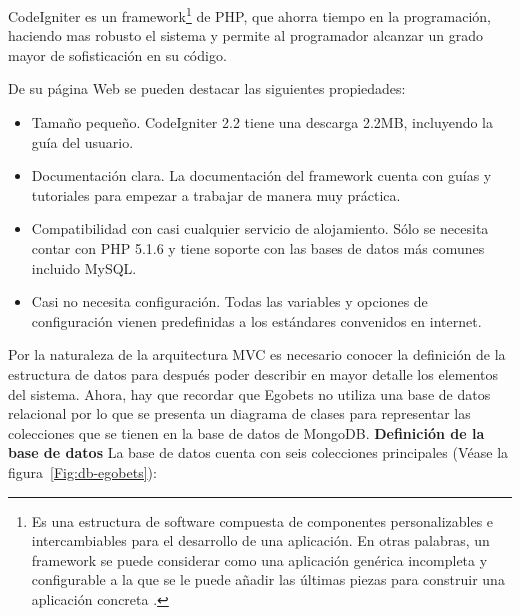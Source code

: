 CodeIgniter es un framework\footnote{Es una estructura de software compuesta de componentes personalizables e intercambiables para el desarrollo de una aplicación. En otras palabras, un framework se puede considerar como una aplicación genérica incompleta y configurable a la que se le puede añadir las últimas piezas para construir una aplicación concreta \cite{upton2007codeigniter}.} de PHP, que ahorra tiempo en la programación, haciendo mas robusto el sistema y permite al programador alcanzar un grado mayor de sofisticación en su código.

	De su página Web \cite{codeigniterWeb} se pueden destacar las siguientes propiedades:
	\begin{itemize}
		\item Tamaño pequeño. CodeIgniter 2.2 tiene una descarga 2.2MB, incluyendo la guía del usuario.
		\item Documentación clara. La documentación del framework cuenta con guías y tutoriales para empezar a trabajar de manera muy práctica.
		\item Compatibilidad con casi cualquier servicio de alojamiento. Sólo se necesita contar con PHP 5.1.6 y tiene soporte con las bases de datos más comunes incluido MySQL.
		\item Casi no necesita configuración. Todas las variables y opciones de configuración vienen predefinidas a los estándares convenidos en internet.

	\end{itemize}


	Por la naturaleza de la arquitectura MVC es necesario conocer la definición de la estructura de datos para después poder describir en mayor detalle los elementos del sistema. Ahora, hay que recordar que Egobets no utiliza una base de datos relacional por lo que se presenta un diagrama de clases para representar las colecciones que se tienen en la base de datos de MongoDB.
	\textbf{Definición de la base de datos}
	La base de datos cuenta con seis colecciones principales (Véase la figura~\ref{Fig:db-egobets}):

